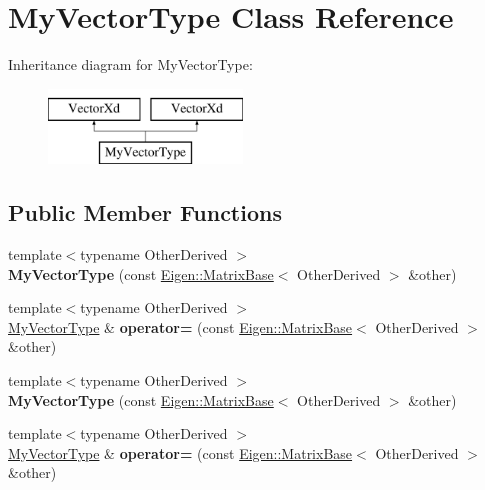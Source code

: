 \hypertarget{class_my_vector_type}{}\section{My\+Vector\+Type Class Reference}
\label{class_my_vector_type}
Inheritance diagram for My\+Vector\+Type\+:\begin{figure}[H]
\begin{center}
\leavevmode
\includegraphics[height=2.000000cm]{class_my_vector_type}
\end{center}
\end{figure}
\subsection*{Public Member Functions}
\begin{DoxyCompactItemize}
\item 
\mbox{\label{class_my_vector_type_aedc145b749ea14ed091d36b8938eb2d9}} 
{\footnotesize template$<$typename Other\+Derived $>$ }\\{\bfseries My\+Vector\+Type} (const \hyperlink{group___core___module_class_eigen_1_1_matrix_base}{Eigen\+::\+Matrix\+Base}$<$ Other\+Derived $>$ \&other)
\item 
\mbox{\label{class_my_vector_type_aa412e8445451e9fe8c438c98ef2197dc}} 
{\footnotesize template$<$typename Other\+Derived $>$ }\\\hyperlink{class_my_vector_type}{My\+Vector\+Type} \& {\bfseries operator=} (const \hyperlink{group___core___module_class_eigen_1_1_matrix_base}{Eigen\+::\+Matrix\+Base}$<$ Other\+Derived $>$ \&other)
\item 
\mbox{\label{class_my_vector_type_aedc145b749ea14ed091d36b8938eb2d9}} 
{\footnotesize template$<$typename Other\+Derived $>$ }\\{\bfseries My\+Vector\+Type} (const \hyperlink{group___core___module_class_eigen_1_1_matrix_base}{Eigen\+::\+Matrix\+Base}$<$ Other\+Derived $>$ \&other)
\item 
\mbox{\label{class_my_vector_type_aa412e8445451e9fe8c438c98ef2197dc}} 
{\footnotesize template$<$typename Other\+Derived $>$ }\\\hyperlink{class_my_vector_type}{My\+Vector\+Type} \& {\bfseries operator=} (const \hyperlink{group___core___module_class_eigen_1_1_matrix_base}{Eigen\+::\+Matrix\+Base}$<$ Other\+Derived $>$ \&other)
\end{DoxyCompactItemize}


